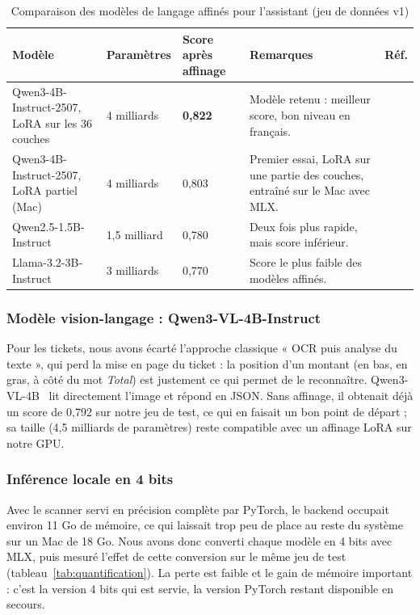 \begin{table}[H]
\centering
\small
\begin{tabularx}{\textwidth}{|L{4.4cm}|C{1.9cm}|C{2.2cm}|Y|C{0.9cm}|}
\hline
{}\textbf{Modèle} & \textbf{Paramètres} & \textbf{Score après affinage} & \textbf{Remarques} & \textbf{Réf.} \\ \hline
Qwen3-4B-Instruct-2507, LoRA sur les 36 couches & 4 milliards & \textbf{0,822} & Modèle retenu : meilleur score, bon
niveau en français. & \cite{qwen3_4b} \\ \hline
Qwen3-4B-Instruct-2507, LoRA partiel (Mac) & 4 milliards & 0,803 & Premier essai, LoRA sur une partie des couches, entraîné sur le Mac avec MLX. & \cite{qwen3_4b} \\ \hline
Qwen2.5-1.5B-Instruct & 1,5 milliard & 0,780 & Deux fois plus rapide, mais score inférieur. & \cite{qwen25} \\ \hline
Llama-3.2-3B-Instruct & 3 milliards & 0,770 & Score le plus faible des modèles affinés. & \cite{llama32} \\ \hline
\end{tabularx}
\caption{Comparaison des modèles de langage affinés pour l'assistant (jeu de données v1)}
\label{tab:choix_llm}
\end{table}

\subsubsection{Modèle vision-langage : Qwen3-VL-4B-Instruct}

Pour les tickets, nous avons écarté l'approche classique « OCR puis analyse du texte »,
qui perd la mise en page du ticket : la position d'un montant (en bas, en gras, à côté du
mot \textit{Total}) est justement ce qui permet de le reconnaître. Qwen3-VL-4B~\cite{qwen3vl}
lit directement l'image et répond en JSON. Sans affinage, il obtenait déjà un score de 0,792
sur notre jeu de test, ce qui en faisait un bon point de départ ; sa taille (4,5 milliards de
paramètres) reste compatible avec un affinage LoRA sur notre GPU.

\subsubsection{Inférence locale en 4 bits}

Avec le scanner servi en précision complète par PyTorch, le backend occupait environ 11 Go
de mémoire, ce qui laissait trop peu de place au reste du système sur un Mac de 18 Go. Nous avons donc converti chaque modèle en 4 bits avec MLX, puis mesuré l'effet de
cette conversion sur le même jeu de test (tableau~\ref{tab:quantification}). La perte est
faible et le gain de mémoire important : c'est la version 4 bits qui est servie, la version
PyTorch restant disponible en secours.

